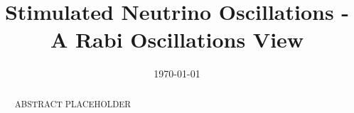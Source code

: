 \documentclass[%
preprint,
 amsmath,amssymb,
 aps,
]{revtex4-1}
\begin{document}

\title{Stimulated Neutrino Oscillations - A Rabi Oscillations View}%

\author{}




\date{\today}%

\begin{abstract}
ABSTRACT PLACEHOLDER
\end{abstract}

\maketitle
\end{document}
